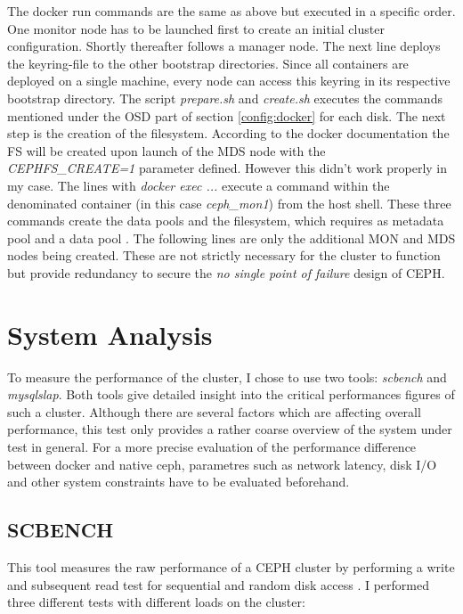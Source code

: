 \documentclass[titlepage, a4paper, 11pt]{scrartcl}
\begin{document}
                The docker run commands are the same as above but executed in a specific order. One monitor node has to be launched first to create an initial cluster configuration.
                Shortly thereafter follows a manager node. The next line deploys the keyring-file to the other bootstrap directories. Since all containers are deployed on a single machine, every node can access this keyring in its respective bootstrap directory. The script \textit{prepare.sh} and \textit{create.sh} executes the commands mentioned under the OSD part of section \ref*{config:docker} for each disk.
                The next step is the creation of the filesystem. According to the docker documentation the FS will be created upon launch of the MDS node with the \textit{CEPHFS\_CREATE=1} parameter defined. However this didn't work properly in my case. The lines with \textit{docker exec ...} execute a command within the denominated container (in this case 
                \textit{ceph\_mon1}) from the host shell. These three commands create the data pools and the filesystem, which requires as metadata pool and a data pool \cite{CreateaCephfilesystem}.
                The following lines are only the additional MON and MDS nodes being created. These are not strictly  necessary for the cluster to function but provide redundancy to secure the \textit{no single point of failure} design of CEPH.

    \section{System Analysis}

        To measure the performance of the cluster, I chose to use two tools: \textit{scbench} and \textit{mysqlslap}. Both tools give detailed insight into
        the critical performances figures of such a cluster. Although there are several factors which are affecting overall performance, this test only provides a rather coarse overview of the system under test in general. For a more precise evaluation of the performance difference between docker and native ceph, parametres such as network latency, disk I/O and other system constraints have to be evaluated beforehand.

        \subsection{SCBENCH} 

            This tool measures the raw performance of a CEPH cluster by performing a write and subsequent read test for sequential and random disk access \cite{cephperformancebenchmark}. I performed three different tests with different loads on the cluster:
\end{document}
